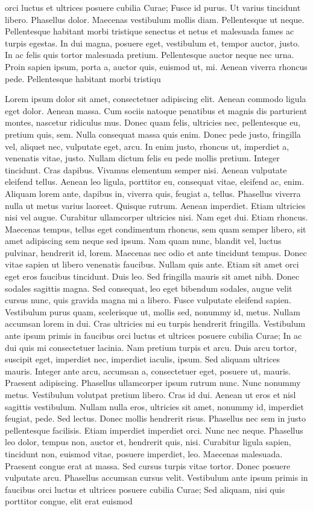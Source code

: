 orci luctus et ultrices posuere cubilia Curae; Fusce id purus. Ut varius tincidunt libero. Phasellus dolor. Maecenas vestibulum mollis diam. Pellentesque ut neque. Pellentesque habitant morbi tristique senectus et netus et malesuada fames ac turpis egestas. In dui magna, posuere eget, vestibulum et, tempor auctor, justo. In ac felis quis tortor malesuada pretium. Pellentesque auctor neque nec urna. Proin sapien ipsum, porta a, auctor quis, euismod ut, mi. Aenean viverra rhoncus pede. Pellentesque habitant morbi tristiqu

Lorem ipsum dolor sit amet, consectetuer adipiscing elit. Aenean commodo ligula eget dolor. Aenean massa. Cum sociis natoque penatibus et magnis dis parturient montes, nascetur ridiculus mus. Donec quam felis, ultricies nec, pellentesque eu, pretium quis, sem. Nulla consequat massa quis enim. Donec pede justo, fringilla vel, aliquet nec, vulputate eget, arcu. In enim justo, rhoncus ut, imperdiet a, venenatis vitae, justo. Nullam dictum felis eu pede mollis pretium. Integer tincidunt. Cras dapibus. Vivamus elementum semper nisi. Aenean vulputate eleifend tellus. Aenean leo ligula, porttitor eu, consequat vitae, eleifend ac, enim. Aliquam lorem ante, dapibus in, viverra quis, feugiat a, tellus. Phasellus viverra nulla ut metus varius laoreet. Quisque rutrum. Aenean imperdiet. Etiam ultricies nisi vel augue. Curabitur ullamcorper ultricies nisi. Nam eget dui. Etiam rhoncus. Maecenas tempus, tellus eget condimentum rhoncus, sem quam semper libero, sit amet adipiscing sem neque sed ipsum. Nam quam nunc, blandit vel, luctus pulvinar, hendrerit id, lorem. Maecenas nec odio et ante tincidunt tempus. Donec vitae sapien ut libero venenatis faucibus. Nullam quis ante. Etiam sit amet orci eget eros faucibus tincidunt. Duis leo. Sed fringilla mauris sit amet nibh. Donec sodales sagittis magna. Sed consequat, leo eget bibendum sodales, augue velit cursus nunc, quis gravida magna mi a libero. Fusce vulputate eleifend sapien. Vestibulum purus quam, scelerisque ut, mollis sed, nonummy id, metus. Nullam accumsan lorem in dui. Cras ultricies mi eu turpis hendrerit fringilla. Vestibulum ante ipsum primis in faucibus orci luctus et ultrices posuere cubilia Curae; In ac dui quis mi consectetuer lacinia. Nam pretium turpis et arcu. Duis arcu tortor, suscipit eget, imperdiet nec, imperdiet iaculis, ipsum. Sed aliquam ultrices mauris. Integer ante arcu, accumsan a, consectetuer eget, posuere ut, mauris. Praesent adipiscing. Phasellus ullamcorper ipsum rutrum nunc. Nunc nonummy metus. Vestibulum volutpat pretium libero. Cras id dui. Aenean ut eros et nisl sagittis vestibulum. Nullam nulla eros, ultricies sit amet, nonummy id, imperdiet feugiat, pede. Sed lectus. Donec mollis hendrerit risus. Phasellus nec sem in justo pellentesque facilisis. Etiam imperdiet imperdiet orci. Nunc nec neque. Phasellus leo dolor, tempus non, auctor et, hendrerit quis, nisi. Curabitur ligula sapien, tincidunt non, euismod vitae, posuere imperdiet, leo. Maecenas malesuada. Praesent congue erat at massa. Sed cursus turpis vitae tortor. Donec posuere vulputate arcu. Phasellus accumsan cursus velit. Vestibulum ante ipsum primis in faucibus orci luctus et ultrices posuere cubilia Curae; Sed aliquam, nisi quis porttitor congue, elit erat euismod 